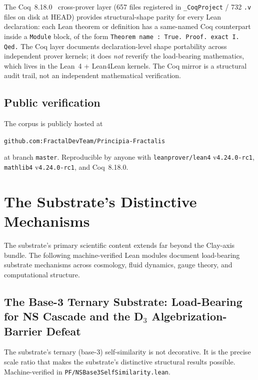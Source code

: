 \documentclass[11pt,a4paper]{amsart}
\theoremstyle{plain}
\theoremstyle{definition}
\begin{document}
The Coq~8.18.0~\cite{barras-bertot2009} cross-prover layer (657 files registered in \texttt{\_CoqProject} / 732 \texttt{.v} files on disk at HEAD) provides structural-shape parity for every Lean declaration: each Lean theorem or definition has a same-named Coq counterpart inside a \texttt{Module} block, of the form \texttt{Theorem name : True. Proof. exact I. Qed.} The Coq layer documents declaration-level shape portability across independent prover kernels; it does \emph{not} reverify the load-bearing mathematics, which lives in the Lean~4 + Lean4Lean kernels. The Coq mirror is a structural audit trail, not an independent mathematical verification.

\subsection{Public verification}

The corpus is publicly hosted at
\begin{center}
\texttt{github.com:FractalDevTeam/Principia-Fractalis}
\end{center}
at branch \texttt{master}. Reproducible by anyone with \texttt{leanprover/lean4} v\texttt{4.24.0-rc1}, \texttt{mathlib4} v\texttt{4.24.0-rc1}, and Coq~8.18.0.

\section{The Substrate's Distinctive Mechanisms}\label{sec:distinctive-mechanisms}

The substrate's primary scientific content extends far beyond the Clay-axis bundle. The following machine-verified Lean modules document load-bearing substrate mechanisms across cosmology, fluid dynamics, gauge theory, and computational structure.

\subsection{The Base-3 Ternary Substrate: Load-Bearing for NS Cascade and the D\texorpdfstring{$_3$}{3} Algebrization-Barrier Defeat}\label{subsec:base3-ternary}

The substrate's ternary (base-3) self-similarity is not decorative. It is the precise scale ratio that makes the substrate's distinctive structural results possible. Machine-verified in \texttt{PF/NSBase3SelfSimilarity.lean}.
\end{document}
